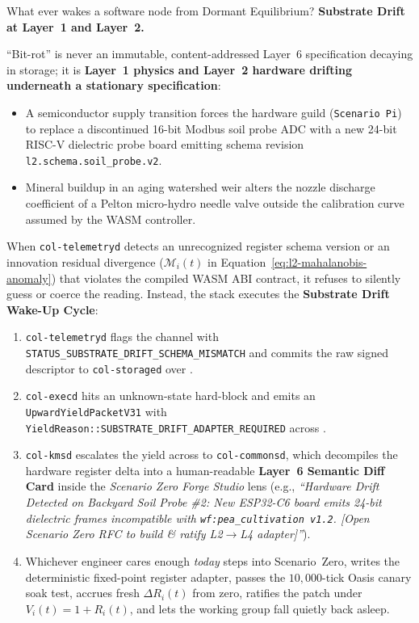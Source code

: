What ever wakes a software node from Dormant Equilibrium? \textbf{Substrate Drift at Layer~1 and Layer~2.}

``Bit-rot'' is never an immutable, content-addressed Layer~6 specification decaying in storage; it is \textbf{Layer~1 physics and Layer~2 hardware drifting underneath a stationary specification}:
\begin{itemize}
    \item A semiconductor supply transition forces the hardware guild (\texttt{Scenario Pi}) to replace a discontinued 16-bit Modbus soil probe ADC with a new 24-bit RISC-V dielectric probe board emitting schema revision \texttt{l2.schema.soil\_probe.v2}.
    \item Mineral buildup in an aging watershed weir alters the nozzle discharge coefficient of a Pelton micro-hydro needle valve outside the calibration curve assumed by the WASM controller.
\end{itemize}

When \texttt{col-telemetryd} detects an unrecognized register schema version or an innovation residual divergence ($\mathcal{M}_i(t)$ in Equation~\eqref{eq:l2-mahalanobis-anomaly}) that violates the compiled WASM ABI contract, it refuses to silently guess or coerce the reading. Instead, the stack executes the \textbf{Substrate Drift Wake-Up Cycle}:
\begin{enumerate}
    \item \texttt{col-telemetryd} flags the channel with \texttt{STATUS\_SUBSTRATE\_DRIFT\_SCHEMA\_MISMATCH} and commits the raw signed descriptor to \texttt{col-storaged} over .
    \item \texttt{col-execd} hits an unknown-state hard-block and emits an \texttt{UpwardYieldPacketV31} with \texttt{YieldReason::SUBSTRATE\_DRIFT\_ADAPTER\_REQUIRED} across .
    \item \texttt{col-kmsd} escalates the yield across  to \texttt{col-commonsd}, which decompiles the hardware register delta into a human-readable \textbf{Layer~6 Semantic Diff Card} inside the \textit{Scenario Zero Forge Studio} lens (e.g., \textit{``Hardware Drift Detected on Backyard Soil Probe \#2: New ESP32-C6 board emits 24-bit dielectric frames incompatible with \texttt{wf:pea\_cultivation v1.2}. [Open Scenario Zero RFC to build \& ratify L2$\to$L4 adapter]''}).
    \item Whichever engineer cares enough \textit{today} steps into Scenario~Zero, writes the deterministic fixed-point register adapter, passes the $10{,}000$-tick Oasis canary soak test, accrues fresh $\Delta R_i(t)$ from zero, ratifies the patch under $V_i(t) = 1 + R_i(t)$, and lets the working group fall quietly back asleep.
\end{enumerate}
